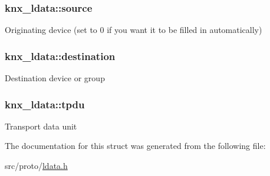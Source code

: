 \subsubsection[{\texorpdfstring{source}{source}}]{ knx\+\_\+ldata\+::source}\hypertarget{structknx__ldata_a97901fe0a2260a11dec4c1685cff63b6}{}\label{structknx__ldata_a97901fe0a2260a11dec4c1685cff63b6}
Originating device (set to 0 if you want it to be filled in automatically) 
\subsubsection[{\texorpdfstring{destination}{destination}}]{ knx\+\_\+ldata\+::destination}\hypertarget{structknx__ldata_a2c84f12aa89d8d00ac24f3bb9305d739}{}\label{structknx__ldata_a2c84f12aa89d8d00ac24f3bb9305d739}
Destination device or group 
\subsubsection[{\texorpdfstring{tpdu}{tpdu}}]{ knx\+\_\+ldata\+::tpdu}\hypertarget{structknx__ldata_a096ce543e8bf7400388c0babf862817c}{}\label{structknx__ldata_a096ce543e8bf7400388c0babf862817c}
Transport data unit 

The documentation for this struct was generated from the following file\+:\begin{DoxyCompactItemize}
\item 
src/proto/\hyperlink{ldata_8h}{ldata.\+h}\end{DoxyCompactItemize}
